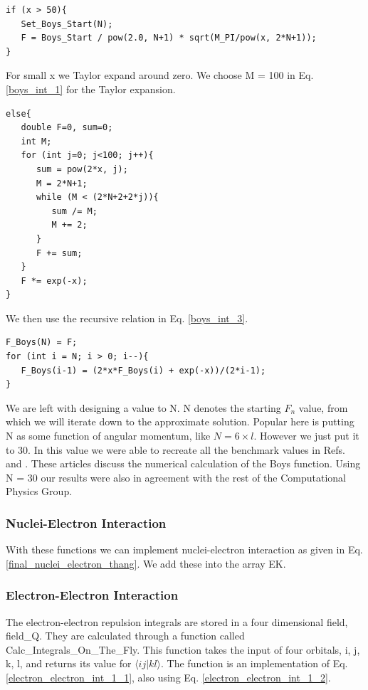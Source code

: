 \documentclass[a4paper,norsk,11pt,twoside]{report}
\begin{document}
\begin{lstlisting}
if (x > 50){
   Set_Boys_Start(N);
   F = Boys_Start / pow(2.0, N+1) * sqrt(M_PI/pow(x, 2*N+1));
}
\end{lstlisting}
For small x we Taylor expand around zero. We choose M = 100 in Eq. \eqref{boys_int_1} for the Taylor expansion. 

\begin{lstlisting}
else{
   double F=0, sum=0;
   int M;
   for (int j=0; j<100; j++){
      sum = pow(2*x, j);
      M = 2*N+1;
      while (M < (2*N+2+2*j)){
         sum /= M;
         M += 2;
      }
      F += sum;
   }
   F *= exp(-x);
}
\end{lstlisting}
We then use the recursive relation in Eq. \eqref{boys_int_3}. 

\begin{lstlisting}
F_Boys(N) = F;
for (int i = N; i > 0; i--){
   F_Boys(i-1) = (2*x*F_Boys(i) + exp(-x))/(2*i-1);
}
\end{lstlisting}
We are left with designing a value to N. N denotes the starting $F_n$ value, from which we will iterate down to the approximate solution. Popular here is putting N as some function of angular momentum, like $N = 6 \times l$. However we just put it to 30. In this value we were able to recreate all the benchmark values in Refs. \cite{boys_referanse_1} and \cite{boys_referanse_2}. These articles discuss the numerical calculation of the Boys function. Using N = 30 our results were also in agreement with the rest of the Computational Physics Group.

\subsubsection{Nuclei-Electron Interaction}
With these functions we can implement nuclei-electron interaction as given in Eq. \eqref{final_nuclei_electron_thang}. We add these into the array EK. 

\subsubsection{Electron-Electron Interaction}
The electron-electron repulsion integrals are stored in a four dimensional field, field\_Q. They are calculated through a function called Calc\_Integrals\_On\_The\_Fly. This function takes the input of four orbitals, i, j, k, l, and returns its value for $\langle i j | k l \rangle$. The function is an implementation of Eq. \eqref{electron_electron_int_1_1}, also using Eq. \eqref{electron_electron_int_1_2}. \\
\end{document}
